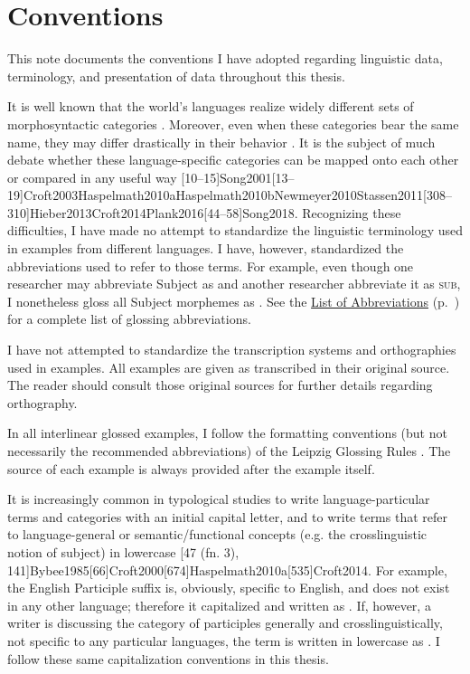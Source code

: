 \chapter{Conventions}
\label{ch:conventions}

This note documents the conventions I have adopted regarding linguistic data, terminology, and presentation of data throughout this thesis.


It is well known that the world's languages realize widely different sets of morphosyntactic categories . Moreover, even when these categories bear the same name, they may differ drastically in their behavior \citep[9]{Dixon2010}. It is the subject of much debate whether these language-specific categories can be mapped onto each other or compared in any useful way [10--15]{Song2001}[13--19]{Croft2003}{Haspelmath2010a}{Haspelmath2010b}{Newmeyer2010}{Stassen2011}[308--310]{Hieber2013}{Croft2014}{Plank2016}[44--58]{Song2018}. Recognizing these difficulties, I have made no attempt to standardize the linguistic terminology used in examples from different languages. I have, however, standardized the abbreviations used to refer to those terms. For example, even though one researcher may abbreviate Subject as  and another researcher abbreviate it as \textsc{sub}, I nonetheless gloss all Subject morphemes as . See the \hyperref[ch:abbreviations]{List of Abbreviations} (p.~\pageref{ch:abbreviations}) for a complete list of glossing abbreviations.

I have not attempted to standardize the transcription systems and orthographies used in examples. All examples are given as transcribed in their original source. The reader should consult those original sources for further details regarding orthography.

In all interlinear glossed examples, I follow the formatting conventions (but not necessarily the recommended abbreviations) of the Leipzig Glossing Rules \citep{BickelComrieHaspelmath2015}. The source of each example is always provided after the example itself.


It is increasingly common in typological studies to write language-particular terms and categories with an initial capital letter, and to write terms that refer to language-general or semantic/functional concepts (e.g. the crosslinguistic notion of subject) in lowercase [47 (fn. 3), 141]{Bybee1985}[66]{Croft2000}[674]{Haspelmath2010a}[535]{Croft2014}. For example, the English Participle suffix  is, obviously, specific to English, and does not exist in any other language; therefore it capitalized and written as . If, however, a writer is discussing the category of participles generally and crosslinguistically, not specific to any particular languages, the term is written in lowercase as . I follow these same capitalization conventions in this thesis.

